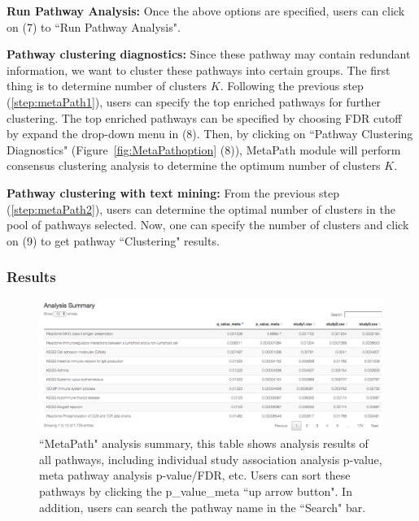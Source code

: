 \begin{steps}
\item \textbf{Run Pathway Analysis:}
\label{step:metaPath1}
Once the above options are specified, users can click on {\color{red}(7)} to ``Run Pathway Analysis".

\item \textbf{Pathway clustering diagnostics:} 
\label{step:metaPath2}
Since these pathway may contain redundant information, 
we want to cluster these pathways into certain groups. 
The first thing is to determine number of clusters $K$.
Following the previous step (\ref{step:metaPath1}), 
users can specify the top enriched pathways for further clustering. 
The top enriched pathways can be specified by choosing FDR cutoff by expand the drop-down menu in {\color{red}(8)}.
Then, by clicking on ``Pathway Clustering Diagnostics" (Figure~\ref{fig:MetaPathoption} {\color{red}(8)}),
MetaPath module will perform consensus clustering analysis to determine the optimum number of clusters $K$.


\item \textbf{Pathway clustering with text mining:} 
\label{step:metaPath3}
From the previous step (\ref{step:metaPath2}), users can determine the optimal number of clusters in the pool of pathways selected. 
Now, one can specify the number of clusters and click on {\color{red}(9)} to get pathway ``Clustering" results. 
\end{steps}




\subsubsection{Results}

\begin{figure}[H]
\begin{center}
\includegraphics[scale=0.4]{./figure/metaPath/metaPathresult1.png}
\caption{``MetaPath" analysis summary, 
this table shows analysis results of all pathways, 
including individual study association analysis p-value, meta pathway analysis p-value/FDR, etc. 
Users can sort these pathways by clicking the p\_value\_meta ``up arrow button".
In addition, users can search the pathway  name in the ``Search" bar.
}
\label{fig:MetaPathresult1}
\end{center}
\end{figure}

